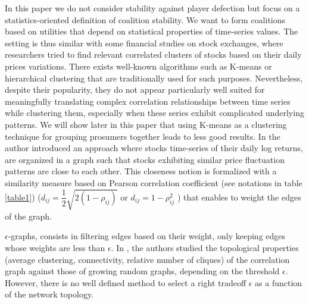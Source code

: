 \documentclass[conference]{IEEEtran}
\begin{document}
In this paper we do not consider stability against player defection but focus on a statistics-oriented definition of coalition stability. We want to form coalitions based on utilities that depend on statistical properties of time-series values. The setting is thus similar with some financial studies on stock exchanges, where researchers tried to find relevant correlated clusters of stocks based on their daily prices variations. There exists well-known algorithms such as K-means or hierarchical clustering that are traditionally used for such purposes. Nevertheless, despite their popularity, they do not appear particularly well suited for meaningfully translating complex correlation relationships between time series while clustering them, especially when these series exhibit complicated underlying patterns. We will show later in this paper that using K-means as a clustering technique for grouping prosumers together leads to less good results. In \cite{Mantegna1999} the author introduced an approach where stocks time-series of their daily log returns, are organized in a graph such that stocks exhibiting similar price fluctuation patterns are close to each other. This closeness notion is formalized with a similarity measure based on Pearson correlation coefficient (see notations in table \ref{table1}) ($ d_{ij} = \dfrac{1}{2}\sqrt{2(1-\rho_{ij})} $ or $ d_{ij} = 1 - \rho_{ij}^{2} $ ) that enables to weight the edges of the graph. 

$\epsilon$-graphs, consists in filtering edges based on their weight, only keeping edges whose weights are less than $ \epsilon $. In \cite{Garas2008, Onnela2004}, the authors studied the topological properties (average clustering, connectivity, relative number of cliques) of the correlation graph against those of growing random graphs, depending on the threshold $ \epsilon $. However, there is no well defined method to select a right tradeoff $ \epsilon $ as a function of the network topology.
\end{document}
